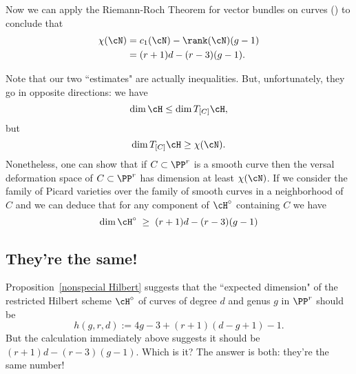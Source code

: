 Now we can apply the Riemann-Roch Theorem for vector bundles on curves (\cite[Theorem ???]{3264}) to conclude that
\begin{align*}
\chi(\cN) &= c_1(\cN) - \rank(\cN)(g-1) \\
&= (r+1)d - (r-3)(g-1).
\end{align*}

Note that our two ``estimates" are actually inequalities. But, unfortunately, they go in opposite directions: we have
$$
\dim \cH \leq \dim T_{[C]}\cH,
$$
but 
$$
\dim T_{[C]}\cH \geq \chi(\cN).
$$
Nonetheless, one can show that if $C \subset \PP^r$ is a smooth curve then the versal deformation space of $C \subset \PP^r$ has dimension at least $\chi(\cN)$. If we consider the family of Picard varieties over the family of smooth curves in a neighborhood of $C$ and we can deduce that for any component of $\cH^\circ$ containing $C$ we have
$$
\dim \cH^\circ \; \geq \; (r+1)d - (r-3)(g-1)
$$

\subsection{They're the same!} Proposition~\ref{nonspecial Hilbert} suggests that the ``expected dimension" of the restricted Hilbert scheme $\cH^\circ$ of curves of degree $d$ and genus $g$ in $\PP^r$ should be 
$$
h(g,r,d) := 4g-3 + (r+1)(d-g+1) - 1.
$$
But the calculation immediately above suggests it should be $(r+1)d - (r-3)(g-1)$. Which is it? The answer is both: they're the same number!




